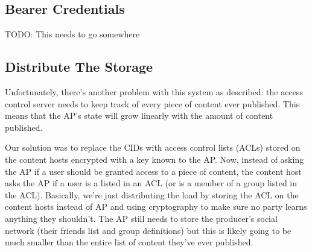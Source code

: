 \documentclass[pdftex,12pt,a4papaer,twoside,notitlepage]{report}
\begin{document}


\subsection{Bearer Credentials}

TODO: This needs to go somewhere

%
%
%
%
%


\subsection{Distribute The Storage}

Unfortunately, there's another problem with this system as described: the access
control server needs to keep track of every piece of content ever published.
This means that the AP's state will grow linearly with the amount of content
published.

Our solution was to replace the CIDs with access control lists (ACLs) stored on
the content hosts encrypted with a key known to the AP. Now, instead of asking
the AP if a user should be granted access to a piece of content, the content
host asks the AP if a user is a listed in an ACL (or is a member of a group
listed in the ACL). Basically, we're just distributing the load by storing the
ACL on the content hosts instead of AP and using cryptography to make sure no
party learns anything they shouldn't. The AP still needs to store the producer's
social network (their friends list and group definitions) but this is likely
going to be much smaller than the entire list of content they've ever published.
\end{document}
